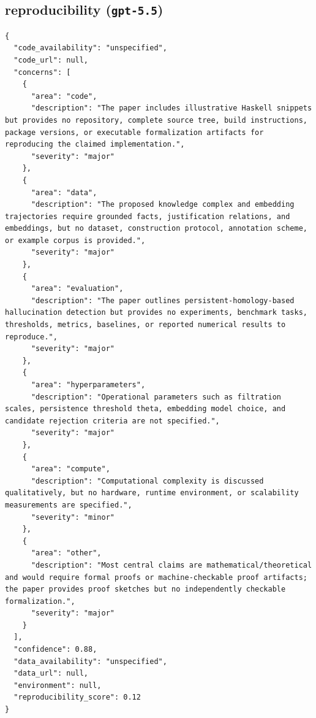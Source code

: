 \documentclass[11pt]{article}
\begin{document}
\subsection*{reproducibility (\texttt{gpt-5.5})}
\begin{verbatim}
{
  "code_availability": "unspecified",
  "code_url": null,
  "concerns": [
    {
      "area": "code",
      "description": "The paper includes illustrative Haskell snippets but provides no repository, complete source tree, build instructions, package versions, or executable formalization artifacts for reproducing the claimed implementation.",
      "severity": "major"
    },
    {
      "area": "data",
      "description": "The proposed knowledge complex and embedding trajectories require grounded facts, justification relations, and embeddings, but no dataset, construction protocol, annotation scheme, or example corpus is provided.",
      "severity": "major"
    },
    {
      "area": "evaluation",
      "description": "The paper outlines persistent-homology-based hallucination detection but provides no experiments, benchmark tasks, thresholds, metrics, baselines, or reported numerical results to reproduce.",
      "severity": "major"
    },
    {
      "area": "hyperparameters",
      "description": "Operational parameters such as filtration scales, persistence threshold theta, embedding model choice, and candidate rejection criteria are not specified.",
      "severity": "major"
    },
    {
      "area": "compute",
      "description": "Computational complexity is discussed qualitatively, but no hardware, runtime environment, or scalability measurements are specified.",
      "severity": "minor"
    },
    {
      "area": "other",
      "description": "Most central claims are mathematical/theoretical and would require formal proofs or machine-checkable proof artifacts; the paper provides proof sketches but no independently checkable formalization.",
      "severity": "major"
    }
  ],
  "confidence": 0.88,
  "data_availability": "unspecified",
  "data_url": null,
  "environment": null,
  "reproducibility_score": 0.12
}
\end{verbatim}
\end{document}
